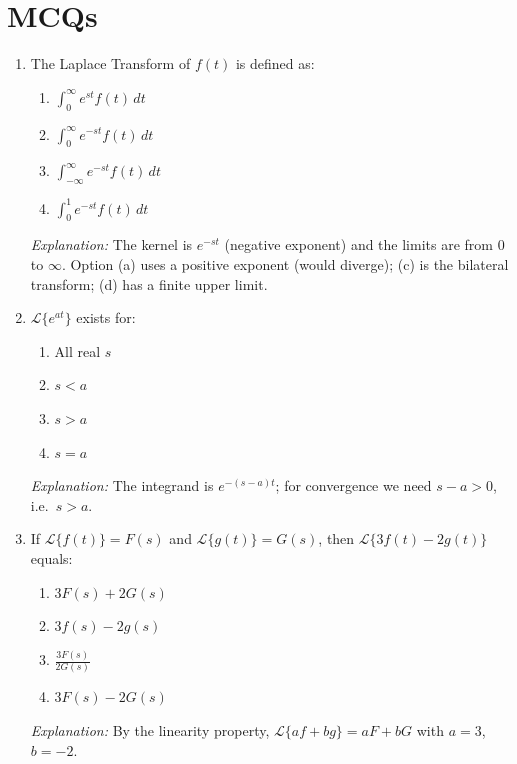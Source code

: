 \documentclass[12pt,a4paper]{article}
\begin{document}
\section{MCQs}

\begin{enumerate}[leftmargin=1.5cm, label=\textbf{MCQ\arabic*.}]

  \item The Laplace Transform of $f(t)$ is defined as:
  \begin{enumerate}[label=(\alph*)]
    \item $\int_0^\infty e^{st} f(t)\, dt$
    \item \textbf{$\int_0^\infty e^{-st} f(t)\, dt$}
    \item $\int_{-\infty}^\infty e^{-st} f(t)\, dt$
    \item $\int_0^1 e^{-st} f(t)\, dt$
  \end{enumerate}
  \textit{Explanation:} The kernel is $e^{-st}$ (negative exponent) and the
  limits are from 0 to $\infty$. Option (a) uses a positive exponent (would
  diverge); (c) is the bilateral transform; (d) has a finite upper limit.

  \item $\mathcal{L}\{e^{at}\}$ exists for:
  \begin{enumerate}[label=(\alph*)]
    \item All real $s$
    \item $s < a$
    \item \textbf{$s > a$}
    \item $s = a$
  \end{enumerate}
  \textit{Explanation:} The integrand is $e^{-(s-a)t}$; for convergence we
  need $s - a > 0$, i.e.\ $s > a$.

  \item If $\mathcal{L}\{f(t)\} = F(s)$ and $\mathcal{L}\{g(t)\} = G(s)$,
        then $\mathcal{L}\{3f(t) - 2g(t)\}$ equals:
  \begin{enumerate}[label=(\alph*)]
    \item $3F(s) + 2G(s)$
    \item $3f(s) - 2g(s)$
    \item $\frac{3F(s)}{2G(s)}$
    \item \textbf{$3F(s) - 2G(s)$}
  \end{enumerate}
  \textit{Explanation:} By the linearity property,
  $\mathcal{L}\{af + bg\} = aF + bG$ with $a = 3$, $b = -2$.


\end{enumerate}
\end{document}
